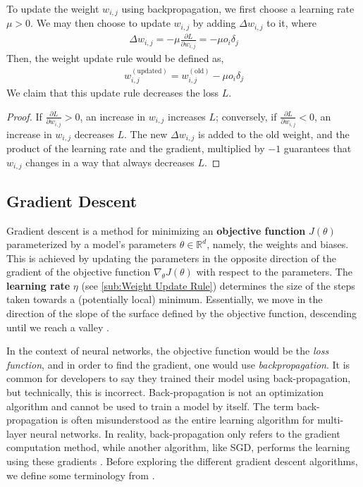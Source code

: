 \documentclass{article}
\begin{document}
  To update the weight $w_{i,j}$ using backpropagation, we first choose a learning rate $\mu> 0$. We may then choose to update $w_{i,j}$ by adding $\Delta w_{i,j}$ to it, where
  \begin{equation*}
    \begin{split}
      \Delta w_{i,j} = -\mu \frac{\partial {L}}{\partial {w_{i,j}}}  = - \mu  o_i \delta_j
    \end{split}
  \end{equation*}
 Then, the weight update rule would be defined as, 
 \begin{equation*}
  \begin{split}
    w_{i,j}^{(\text{updated})} =  w_{i,j}^{(\text{old})} - \mu  o_i \delta_j
  \end{split}
 \end{equation*}
 We claim that this update rule decreases the loss $L$. 
 \begin{proof} 
  
If ${\frac {\partial L}{\partial w_{i,j}}}>0$, an increase in $w_{i,j}$ increases $L$; conversely, if $\frac {\partial L}{\partial w_{i,j}}<0$, an increase in $w_{i,j}$ decreases $L$. The new $\Delta w_{i,j}$ is added to the old weight, and the product of the learning rate and the gradient, multiplied by $-1$ guarantees that $w_{i,j}$  changes in a way that always decreases $L$. 

 \end{proof}
\subsection{Gradient Descent}%
  \label{sub:Gradient Descent}
  
Gradient descent is a method for minimizing an \textbf{objective function} \( J(\theta) \) parameterized by a model's parameters \( \theta \in \mathbb{R}^d \), namely, the weights and biases. This is achieved by updating the parameters in the opposite direction of the gradient of the objective function \( \nabla_{\theta} J(\theta) \) with respect to the parameters. The \textbf{learning rate} \( \eta \) (see \autoref{sub:Weight Update Rule}) determines the size of the steps taken towards a (potentially local) minimum. Essentially, we move in the direction of the slope of the surface defined by the objective function, descending until we reach a valley \citep{ruder2017overview}. 

   In the context of neural networks, the objective function would be the \textit{loss function}, and in order to find the gradient, one would use \textit{backpropagation}. It is common for developers to say they trained their model using back-propagation, but technically, this is incorrect. Back-propagation is not an optimization algorithm and cannot be used to train a model by itself. The term back-propagation is often misunderstood as the entire learning algorithm for multi-layer neural networks. In reality, back-propagation only refers to the gradient computation method, while another algorithm, like SGD, performs the learning using these gradients \citep{Goodfellow-et-al-2016}. Before exploring the different gradient descent algorithms, we define some terminology from \cite{batchvsEpoch}. 
\end{document}
